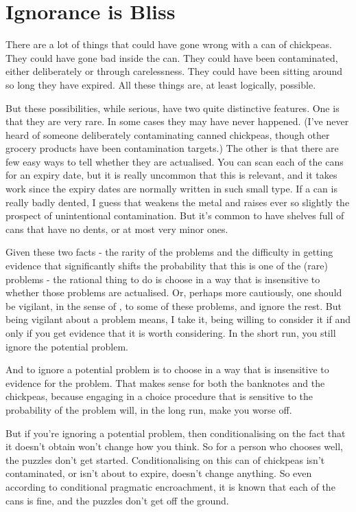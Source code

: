 \documentclass[11pt,]{book}
\begin{document}
\hypertarget{ignorancebliss}{%
\section{Ignorance is Bliss}\label{ignorancebliss}}

There are a lot of things that could have gone wrong with a can of chickpeas. They could have gone bad inside the can. They could have been contaminated, either deliberately or through carelessness. They could have been sitting around so long they have expired. All these things are, at least logically, possible.

But these possibilities, while serious, have two quite distinctive features. One is that they are very rare. In some cases they may have never happened. (I've never heard of someone deliberately contaminating canned chickpeas, though other grocery products have been contamination targets.) The other is that there are few easy ways to tell whether they are actualised. You can scan each of the cans for an expiry date, but it is really uncommon that this is relevant, and it takes work since the expiry dates are normally written in such small type. If a can is really badly dented, I guess that weakens the metal and raises ever so slightly the prospect of unintentional contamination. But it's common to have shelves full of cans that have no dents, or at most very minor ones.

Given these two facts - the rarity of the problems and the difficulty in getting evidence that significantly shifts the probability that this is one of the (rare) problems - the rational thing to do is choose in a way that is insensitive to whether those problems are actualised. Or, perhaps more cautiously, one should be vigilant, in the sense of \citet{SperberEtAl2010}, to some of these problems, and ignore the rest. But being vigilant about a problem means, I take it, being willing to consider it if and only if you get evidence that it is worth considering. In the short run, you still ignore the potential problem.

And to ignore a potential problem is to choose in a way that is insensitive to evidence for the problem. That makes sense for both the banknotes and the chickpeas, because engaging in a choice procedure that is sensitive to the probability of the problem will, in the long run, make you worse off.

But if you're ignoring a potential problem, then conditionalising on the fact that it doesn't obtain won't change how you think. So for a person who chooses well, the puzzles don't get started. Conditionalising on this can of chickpeas isn't contaminated, or isn't about to expire, doesn't change anything. So even according to conditional pragmatic encroachment, it is known that each of the cans is fine, and the puzzles don't get off the ground.
\end{document}
